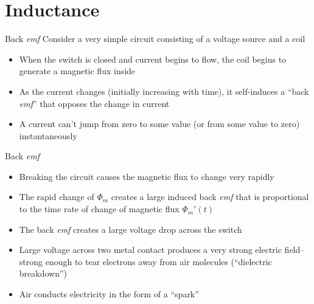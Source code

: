 \documentclass[12pt,aspectratio=169]{beamer}
\begin{document}
\section{Inductance}

\begin{frame}{Back \emph{emf}}
  Consider a very simple circuit consisting of a voltage source and a coil
  \begin{center}
  \end{center}
  \begin{itemize}
  \item When the switch is closed and current begins to flow, the coil
    begins to generate a magnetic flux inside
  \item As the current changes (initially increasing with time), it
    self-induces a ``back \emph{emf}'' that opposes the change in current
  \item A current can't jump from zero to some value (or from some value to
    zero) instantaneously
  \end{itemize}
\end{frame}



\begin{frame}{Back \emph{emf}}
  \begin{center}
  \end{center}
  \begin{itemize}
  \item Breaking the circuit causes the magnetic flux to change very rapidly
  \item The rapid change of $\Phi_m$ creates a large induced back \emph{emf}
    that is proportional to the time rate of change of magnetic flux
    $\Phi_m'(t)$
  \item The back \emph{emf} creates a large voltage drop across the switch
  \item Large voltage across two metal contact produces a very strong electric
    field--strong enough to tear electrons away from air molecules
    (``dielectric breakdown'')
  \item Air conducts electricity in the form of a ``spark''
  \end{itemize}
\end{frame}
\end{document}
